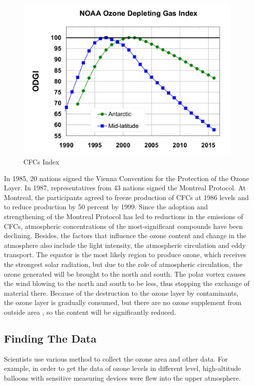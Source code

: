 \documentclass[12pt]{article}
\begin{document}
\begin{center}
\begin{figure}[htpb]
\centering
\includegraphics[scale=0.9]{cfc_index}
\caption{CFCs Index}\label{fig:CFCs index}
\end{figure}
\end{center}



In 1985, 20 nations signed the Vienna Convention for the Protection of the Ozone Layer. In 1987, representatives from 43 nations signed the Montreal Protocol. At Montreal, the participants agreed to freeze production of CFCs at 1986 levels and to reduce production by 50 percent by 1999. Since the adoption and strengthening of the Montreal Protocol has led to reductions in the emissions of CFCs, atmospheric concentrations of the most-significant compounds have been declining.   Besides, the factors that influence the ozone content and change in the atmosphere also include the light intensity, the atmospheric circulation and eddy transport. The equator is the most likely region to produce ozone, which receives the strongest solar radiation, but due to the role of atmospheric circulation, the ozone generated will be brought to the north and south. The polar vortex causes the wind blowing to the north and south to be less, thus stopping the exchange of material there. Because of the destruction to the ozone layer by contaminants, the ozone layer is gradually consumed, but there are no ozone supplement from outside area , so the content will be significantly reduced.
\subsection{Finding The Data}
Scientists use various method to collect the ozone area and other data. For example, in order to get the data of ozone levels in different level, high-altitude balloons with sensitive measuring devices were flew into the upper atmosphere.
\end{document}
